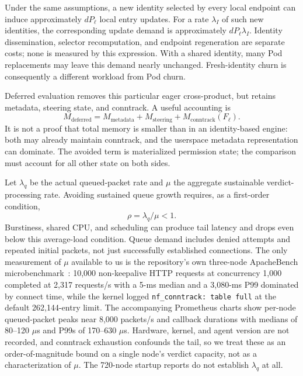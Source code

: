 \documentclass[letterpaper,twocolumn,10pt]{article}
\begin{document}
Under the same assumptions, a new identity selected by every local
endpoint can induce approximately $dP_{\ell}$ local entry updates. For
a rate $\lambda_I$ of such new identities, the corresponding update
demand is approximately $dP_{\ell}\lambda_I$. Identity dissemination,
selector recomputation, and endpoint regeneration are separate costs;
none is measured by this expression. With a shared identity, many Pod
replacements may leave this demand nearly unchanged. Fresh-identity
churn is consequently a different workload from Pod churn.

Deferred evaluation removes this particular eager cross-product, but
retains metadata, steering state, and conntrack. A useful accounting is
\begin{equation}
M_{\mathrm{deferred}} = M_{\mathrm{metadata}} +
M_{\mathrm{steering}} + M_{\mathrm{conntrack}}(F_{\ell}).
\end{equation}
It is not a proof that total memory is smaller than in an identity-based
engine: both may already maintain conntrack, and the userspace metadata
representation can dominate. The avoided term is materialized permission
state; the comparison must account for all other state on both sides.

Let $\lambda_q$ be the actual queued-packet rate and $\mu$ the aggregate
sustainable verdict-processing rate. Avoiding sustained queue growth
requires, as a first-order condition,
\begin{equation}
\rho = \lambda_q/\mu < 1.
\end{equation}
Burstiness, shared CPU, and scheduling can produce tail latency and drops
even below this average-load condition. Queue demand includes denied
attempts and repeated initial packets, not just successfully established
connections. The only measurement of $\mu$ available to us is the
repository's own three-node ApacheBench microbenchmark~\cite{knptesting}:
10,000 non-keepalive HTTP requests at concurrency 1,000 completed at
2,317 requests/s with a 5-ms median and a 3,080-ms P99 dominated by
connect time, while the kernel logged \texttt{nf\_conntrack: table
full} at the default 262,144-entry limit. The accompanying Prometheus
charts show per-node queued-packet peaks near 8,000 packets/s and
callback durations with medians of 80--120 $\mu$s and P99s of
170--630 $\mu$s. Hardware, kernel, and agent version are not recorded,
and conntrack exhaustion confounds the tail, so we treat these as an
order-of-magnitude bound on a single node's verdict capacity, not as a
characterization of $\mu$. The 720-node startup reports do not
establish $\lambda_q$ at all.
\end{document}
